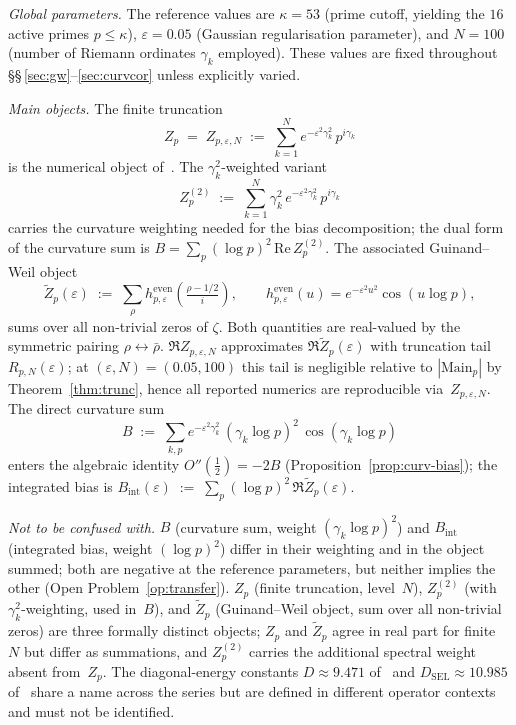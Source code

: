 \documentclass[11pt]{article}
\newcommand{\Zt}{\widetilde{Z}}
\newcommand{\DSEL}{D_{\mathrm{SEL}}}
\begin{document}
\medskip
\emph{Global parameters.}
The reference values are $\kappa=53$ (prime cutoff, yielding the
$16$ active primes $p\le\kappa$), $\varepsilon=0.05$ (Gaussian
regularisation parameter), and $N=100$ (number of Riemann ordinates
$\gamma_k$ employed).
These values are fixed throughout
\S\S\,\ref{sec:gw}--\ref{sec:curvcor} unless explicitly varied.

\medskip
\emph{Main objects.}
The finite truncation
\[
Z_p \;=\; Z_{p,\varepsilon,N} \;:=\;
\sum_{k=1}^{N} e^{-\varepsilon^2\gamma_k^2}\,p^{i\gamma_k}
\]
is the numerical object of~\cite{Paper4,Paper5}.
The $\gamma_k^2$-weighted variant
\[
Z_p^{(2)} \;:=\; \sum_{k=1}^{N} \gamma_k^2\,
e^{-\varepsilon^2\gamma_k^2}\,p^{i\gamma_k}
\]
carries the curvature weighting needed for the bias
decomposition; the dual form of the curvature sum is
$B = \sum_p (\log p)^2\,\mathrm{Re}\,Z_p^{(2)}$.
The associated Guinand--Weil object
\[
\Zt_p(\varepsilon) \;:=\; \sum_{\rho}
h^{\mathrm{even}}_{p,\varepsilon}\!\left(\tfrac{\rho-1/2}{i}\right),
\qquad
h^{\mathrm{even}}_{p,\varepsilon}(u)=e^{-\varepsilon^2 u^2}\cos(u\log p),
\]
sums over all non-trivial zeros of $\zeta$.
Both quantities are real-valued by the symmetric pairing
$\rho\leftrightarrow\bar\rho$.
$\Re Z_{p,\varepsilon,N}$ approximates $\Re\Zt_p(\varepsilon)$ with
truncation tail $R_{p,N}(\varepsilon)$; at
$(\varepsilon,N)=(0.05,100)$ this tail is negligible relative to
$|\mathrm{Main}_p|$ by Theorem~\ref{thm:trunc}, hence all reported
numerics are reproducible via~$Z_{p,\varepsilon,N}$.
The direct curvature sum
\[
B \;:=\; \sum_{k,p} e^{-\varepsilon^2\gamma_k^2}\,
(\gamma_k\log p)^2\,\cos(\gamma_k\log p)
\]
enters the algebraic identity $O''(\tfrac12)=-2B$
(Proposition~\ref{prop:curv-bias}); the integrated bias is
$B_{\mathrm{int}}(\varepsilon)\;:=\;\sum_p (\log p)^2\,\Re\Zt_p(\varepsilon)$.

\medskip
\emph{Not to be confused with.}
$B$ (curvature sum, weight $(\gamma_k\log p)^2$) and $B_{\mathrm{int}}$
(integrated bias, weight $(\log p)^2$) differ in their weighting and
in the object summed; both are negative at the reference parameters,
but neither implies the other (Open Problem~\ref{op:transfer}).
$Z_p$ (finite truncation, level~$N$), $Z_p^{(2)}$ (with
$\gamma_k^2$-weighting, used in~$B$), and $\Zt_p$ (Guinand--Weil object,
sum over all non-trivial zeros) are three formally distinct objects;
$Z_p$ and $\Zt_p$ agree in real part for finite~$N$ but differ as
summations, and $Z_p^{(2)}$ carries the additional spectral weight
absent from~$Z_p$.
The diagonal-energy constants $D\approx 9.471$ of~\cite{Paper2} and
$\DSEL\approx 10.985$ of~\cite{Paper5} share a name across the series
but are defined in different operator contexts and must not be
identified.
\end{document}

